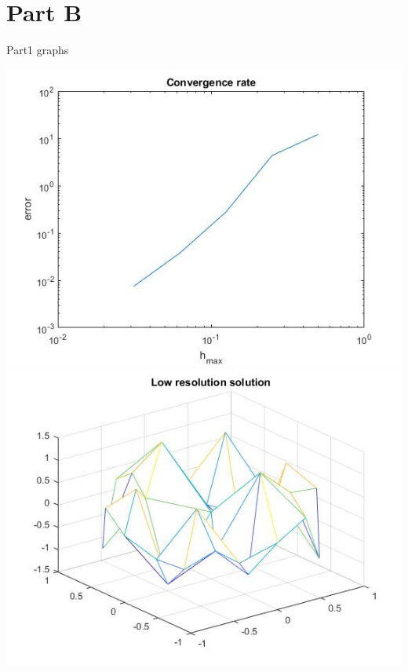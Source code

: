 \documentclass[12pt]{article}
\begin{document}
		
	
	\newpage
	\fi
	\section*{\large Part B}
	\vspace{.5pc}
	
	\large Part1 graphs
	
	
	\normalsize
	\includegraphics[width=\textwidth]{p2_1_convrate}
	\includegraphics[width=\textwidth]{p2_1_lowres}
\end{document}
